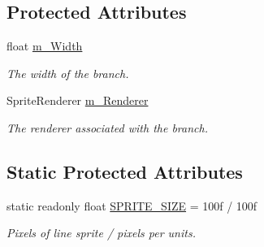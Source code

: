 \subsection*{Protected Attributes}
\begin{DoxyCompactItemize}
\item 
float \hyperlink{class_fractal_tree_1_1_stationary_branch_ad29fc34a0ab42c6bf44277d38816c568}{m\+\_\+\+Width}
\begin{DoxyCompactList}\small\item\em The width of the branch. \end{DoxyCompactList}\item 
Sprite\+Renderer \hyperlink{class_fractal_tree_1_1_stationary_branch_a395acf767c2156a0f203d00322e71512}{m\+\_\+\+Renderer}
\begin{DoxyCompactList}\small\item\em The renderer associated with the branch. \end{DoxyCompactList}\end{DoxyCompactItemize}
\subsection*{Static Protected Attributes}
\begin{DoxyCompactItemize}
\item 
static readonly float \hyperlink{class_fractal_tree_1_1_stationary_branch_aa1486b3c67665c24e3fa10eabbb30197}{S\+P\+R\+I\+T\+E\+\_\+\+S\+I\+ZE} = 100f / 100f
\begin{DoxyCompactList}\small\item\em Pixels of line sprite / pixels per units. \end{DoxyCompactList}\end{DoxyCompactItemize}
